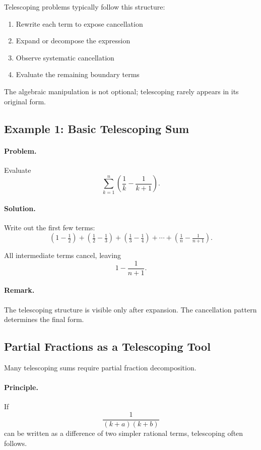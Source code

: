 \documentclass[12pt]{extarticle}
\begin{document}
Telescoping problems typically follow this structure:
\begin{enumerate}
    \item Rewrite each term to expose cancellation
    \item Expand or decompose the expression
    \item Observe systematic cancellation
    \item Evaluate the remaining boundary terms
\end{enumerate}

The algebraic manipulation is not optional; telescoping rarely appears in its original form.

\subsection*{Example 1: Basic Telescoping Sum}

\paragraph{Problem.}
Evaluate
\[
\sum_{k=1}^{n} \left( \frac{1}{k} - \frac{1}{k+1} \right).
\]

\paragraph{Solution.}
Write out the first few terms:
\[
\left(1 - \tfrac12\right) + \left(\tfrac12 - \tfrac13\right) + \left(\tfrac13 - \tfrac14\right) + \cdots + \left(\tfrac1n - \tfrac{1}{n+1}\right).
\]

All intermediate terms cancel, leaving
\[
1 - \frac{1}{n+1}.
\]

\paragraph{Remark.}
The telescoping structure is visible only after expansion. The cancellation pattern determines the final form.

\subsection*{Partial Fractions as a Telescoping Tool}

Many telescoping sums require partial fraction decomposition.

\paragraph{Principle.}
If
\[
\frac{1}{(k+a)(k+b)}
\]
can be written as a difference of two simpler rational terms, telescoping often follows.
\end{document}
